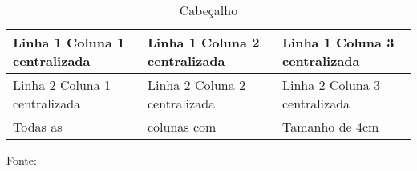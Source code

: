 
	\begin{table}[h]
		\caption{Cabeçalho}	
		\begin{tabular}{|>{\centering\arraybackslash}m{4cm}|>{\centering\arraybackslash}m{4cm}|>{\centering\arraybackslash}m{4cm}|}
			\hline
			Linha 1 Coluna 1 centralizada & Linha 1 Coluna 2 centralizada & Linha 1 Coluna 3 centralizada \\
			\hline
			Linha 2 Coluna 1 centralizada & Linha 2 Coluna 2 centralizada & Linha 2 Coluna 3 centralizada \\
			\hline
			Todas as & colunas com & Tamanho de 4cm \\
			\hline
		\end{tabular}
		Fonte: 
		\label{key}
	\end{table}


